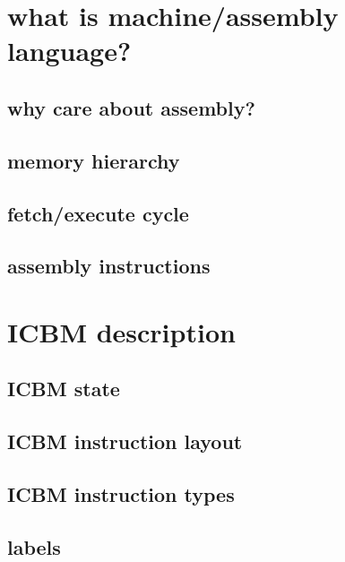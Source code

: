 
\begin{frame}
    \titlepage
\end{frame}

\section{what is machine/assembly language?}

\subsection{why care about assembly?}

\subsection{memory hierarchy} %

\subsection{fetch/execute cycle}

\subsection{assembly instructions}


\section{ICBM description}


\subsection{ICBM state}


\subsection{ICBM instruction layout}

\subsection{ICBM instruction types}

\subsection{labels}

